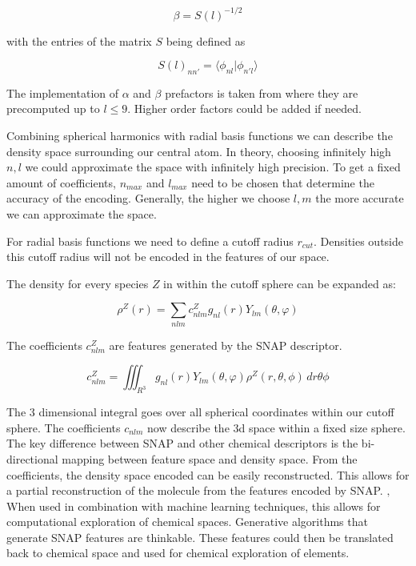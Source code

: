 $$\beta = S(l)^{-1/2} $$

with the entries of the matrix $S$ being defined as

$$S(l)_{nn'} = \langle \phi_{nl} | \phi_{n'l} \rangle  $$

The implementation of $\alpha$ and $\beta$ prefactors is taken from \cite{dscribe} where they are precomputed up to $l \leq 9$.
Higher order factors could be added if needed.


Combining spherical harmonics with radial basis functions we can describe the density space surrounding our central atom.
In theory, choosing infinitely high $n, l$ we could approximate the space with infinitely high precision.
To get a fixed amount of coefficients, $n_{max}$ and $l_{max}$ need to be chosen that determine the
accuracy of the encoding.
Generally, the higher we choose $l, m$ the more accurate we can approximate the space.

For radial basis functions we need to define a cutoff radius $r_{cut}$.
Densities outside this cutoff radius will not be encoded in the features of our space.

The density for every species $Z$ in within the cutoff sphere can be expanded as:

$$ \rho^Z(r) = \sum_{nlm} c^Z_{nlm} g_{nl}(r) Y_{lm}(\theta, \varphi) $$

The coefficients $c_{nlm}^Z$ are features generated by the SNAP descriptor.

$$ c_{nlm}^Z = \iiint_{R^3} g_{nl}(r) Y_{lm}(\theta, \varphi) \rho^Z(r, \theta, \phi)  \,dr\theta\phi   $$

The 3 dimensional integral goes over all spherical coordinates within our cutoff sphere.
The coefficients $c_{nlm}$ now describe the 3d space within a fixed size sphere.
\\
The key difference between SNAP and other chemical descriptors is the bi-directional mapping between feature space and 
density space.
From the coefficients, the density space encoded can be easily reconstructed.
This allows for a partial reconstruction of the molecule from the features encoded by SNAP.
‚
When used in combination with machine learning techniques, this allows for computational exploration of chemical spaces.
Generative algorithms that generate SNAP features are thinkable.
These features could then be translated back to chemical space and used for chemical exploration of elements.
